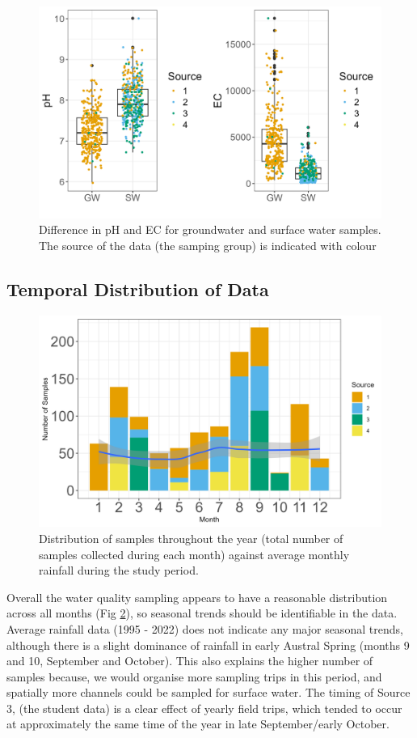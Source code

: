 \documentclass[, manuscript]{copernicus}
\begin{document}
\clearpage

\begin{figure}
\includegraphics[width=0.8\linewidth]{Figures/gwsw} \caption{Difference in pH and EC for groundwater and surface water samples. The source of the data (the samping group) is indicated with colour}\label{fig:gw_sw-plot}
\end{figure}

\subsection{Temporal Distribution of Data}

\clearpage

\begin{figure}
\includegraphics[width=0.5\linewidth]{Figures/monthly} \caption{Distribution of samples throughout the year (total number of samples collected during each month) against average monthly rainfall during the study period. }\label{fig:month-plot}
\end{figure}

\clearpage

Overall the water quality sampling appears to have a reasonable
distribution across all months (Fig \ref{fig:month-plot}), so seasonal
trends should be identifiable in the data. Average rainfall data (1995 -
2022) does not indicate any major seasonal trends, although there is a
slight dominance of rainfall in early Austral Spring (months 9 and 10,
September and October). This also explains the higher number of samples
because, we would organise more sampling trips in this period, and
spatially more channels could be sampled for surface water. The timing
of Source 3, (the student data) is a clear effect of yearly field trips,
which tended to occur at approximately the same time of the year in late
September/early October.
\end{document}

